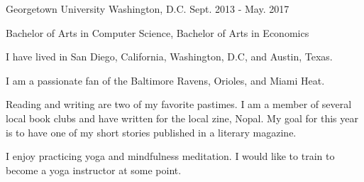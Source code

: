 

\begin{cventries}
  \cventry
  {} %
  {Georgetown University} %
  {Washington, D.C.} %
  {Sept. 2013 - May. 2017} %
  {
    \vspace{-10mm}
    \begin{cvitems} %
      \item {Bachelor of Arts in Computer Science, Bachelor of Arts in Economics}
    \end{cvitems}
  }
  \cventry
  {} %
  {} %
  {} %
  {} %
  {
    \vspace{-4mm}
    \begin{cvitems} %
      \item {I have lived in San Diego, California, Washington, D.C, and Austin, Texas.}
      \item {I am a passionate fan of the Baltimore Ravens, Orioles, and Miami Heat.}
      \item {Reading and writing are two of my favorite pastimes. I am a member of several local book clubs and have written for the local zine, Nopal. My goal for this year is to have one of my short stories published in a literary magazine.}
      \item {I enjoy practicing yoga and mindfulness meditation. I would like to train to become a yoga instructor at some point.}
    \end{cvitems}
  }

\end{cventries}
